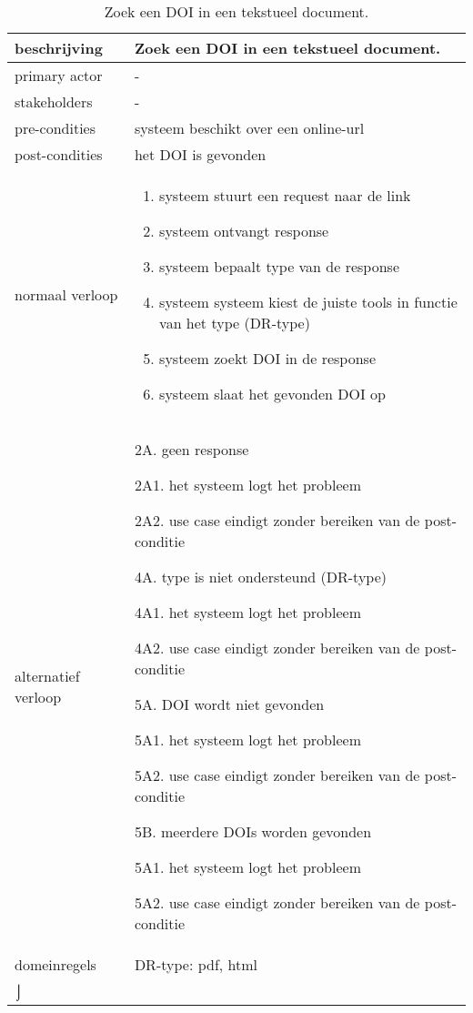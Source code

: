 \begin{table}[ptb]
    \centering
    \begin{tabular}{ | m{5cm} | m{10cm}| } 
        \hline
        \rowcolor{lightgray}
        beschrijving & Zoek een DOI in een tekstueel document. \\ 
        \hline
        primary actor & - \\ 
        \hline
        stakeholders & - \\ 
        \hline
        pre-condities & systeem beschikt over een online-url \\ 
        \hline
        post-condities & het DOI is gevonden \\ 
        \hline
        normaal verloop & 
        \begin{enumerate}
            \item systeem stuurt een request naar de link
            \item systeem ontvangt response
            \item systeem bepaalt type van de response
            \item systeem systeem kiest de juiste tools in functie van het type (DR-type)
            \item systeem zoekt DOI in de response
            \item systeem slaat het gevonden DOI op
        \end{enumerate} \\ 
        \hline
        alternatief verloop & 
        \begin{description}
            \item 2A. geen response
            \item 2A1. het systeem logt het probleem
            \item 2A2. use case eindigt zonder bereiken van de post-conditie
            \item 4A. type is niet ondersteund (DR-type)
            \item 4A1. het systeem logt het probleem
            \item 4A2. use case eindigt zonder bereiken van de post-conditie
            \item 5A. DOI wordt niet gevonden
            \item 5A1. het systeem logt het probleem
            \item 5A2. use case eindigt zonder bereiken van de post-conditie
            \item 5B. meerdere DOIs worden gevonden
            \item 5A1. het systeem logt het probleem
            \item 5A2. use case eindigt zonder bereiken van de post-conditie
        \end{description} \\ 
        \hline
        domeinregels & DR-type: pdf, html\\⌡ 
        \hline
    \end{tabular}
    \caption{Zoek een DOI in een tekstueel document.}
\end{table}
